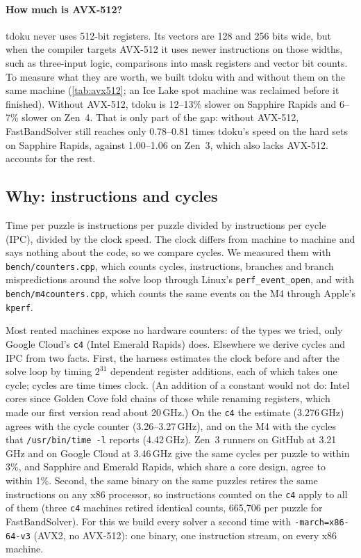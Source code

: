 \documentclass[11pt]{article}
\theoremstyle{definition}
\theoremstyle{plain}
\begin{document}
\paragraph{How much is AVX-512?} tdoku never uses 512-bit registers. Its vectors are 128 and 256 bits wide, but when
the compiler targets AVX-512 it uses newer instructions on those widths, such as three-input logic, comparisons into mask
registers and vector bit counts. To measure what
they are worth, we built tdoku with and without them on the same machine (\cref{tab:avx512}; an Ice Lake spot machine
was reclaimed before it finished). Without AVX-512, tdoku is 12--13\% slower on Sapphire Rapids and 6--7\% slower on
Zen~4. That is only part of the gap: without AVX-512, FastBandSolver still reaches only 0.78--0.81 times tdoku's speed
on the hard sets on Sapphire Rapids, against 1.00--1.06 on Zen~3, which also lacks AVX-512.  accounts for the rest.

\subsection{Why: instructions and cycles}
\label{sec:why}

Time per puzzle is instructions per puzzle divided by instructions per cycle (IPC), divided by the clock speed. The
clock differs from machine to machine and says nothing about the code, so we compare cycles. We measured them with
\texttt{bench/counters.cpp}, which counts cycles, instructions, branches and branch mispredictions around the solve
loop through Linux's \texttt{perf\_event\_open}, and with \texttt{bench/m4counters.cpp}, which counts the same events
on the M4 through Apple's \texttt{kperf}.

Most rented machines expose no hardware counters: of the types we tried, only Google Cloud's \texttt{c4} (Intel Emerald
Rapids) does. Elsewhere we derive cycles and IPC from two facts. First, the harness estimates the clock before and
after the solve loop by timing $2^{31}$ dependent register additions, each of which takes one cycle; cycles are time
times clock. (An addition of a constant would not do: Intel cores since Golden Cove fold chains of those while
renaming registers, which made our first version read about 20\,GHz.) On the \texttt{c4} the estimate (3.276\,GHz)
agrees with the cycle counter (3.26--3.27\,GHz), and on the M4 with the cycles that \texttt{/usr/bin/time -l}
reports (4.42\,GHz). Zen~3 runners on GitHub
at 3.21\,GHz and on Google Cloud at 3.46\,GHz give the same cycles per puzzle to within 3\%, and Sapphire and Emerald
Rapids, which share a core design, agree to within 1\%. Second, the same binary on the same puzzles retires the same
instructions on any x86 processor, so instructions counted on the \texttt{c4} apply to all of them (three \texttt{c4}
machines retired identical counts, 665{,}706 per puzzle for FastBandSolver). For this we build every solver a second
time with \texttt{-march=x86-64-v3} (AVX2, no AVX-512): one binary, one instruction stream, on every x86 machine.
\end{document}
